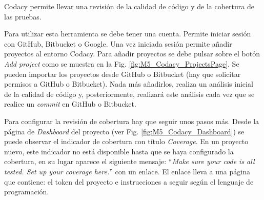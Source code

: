 Codacy permite llevar una revisión de la calidad de código y de la cobertura de las pruebas.

Para utilizar esta herramienta se debe tener una cuenta. Permite iniciar sesión con GitHub, Bitbucket o Google. Una vez iniciada sesión permite añadir proyectos al entorno Codacy. Para añadir proyectos se debe pulsar sobre el botón \textit{Add project} como se muestra en la Fig. \ref{fig:M5_Codacy_ProjectsPage}. Se pueden importar los proyectos desde GitHub o Bitbucket (hay que solicitar permisos a GitHub o Bitbucket). Nada más añadirlos, realiza un análisis inicial de la calidad de código y, posteriormente, realizará este análisis cada vez que se realice un \textit{commit} en GitHub o Bitbucket.


Para configurar la revisión de cobertura hay que seguir unos pasos más. Desde la página de \textit{Dashboard} del proyecto (ver Fig. \ref{fig:M5_Codacy_Dashboard}) se puede observar el indicador de cobertura con título \textit{Coverage}. En un proyecto nuevo, este indicador no está disponible hasta que se haya configurado la cobertura, en su lugar aparece el siguiente mensaje: ``\textit{Make sure your code is all tested. Set up your coverage here.}'' con un enlace. El enlace lleva a una página que contiene: el token del proyecto e instrucciones a seguir según el lenguaje de programación.



